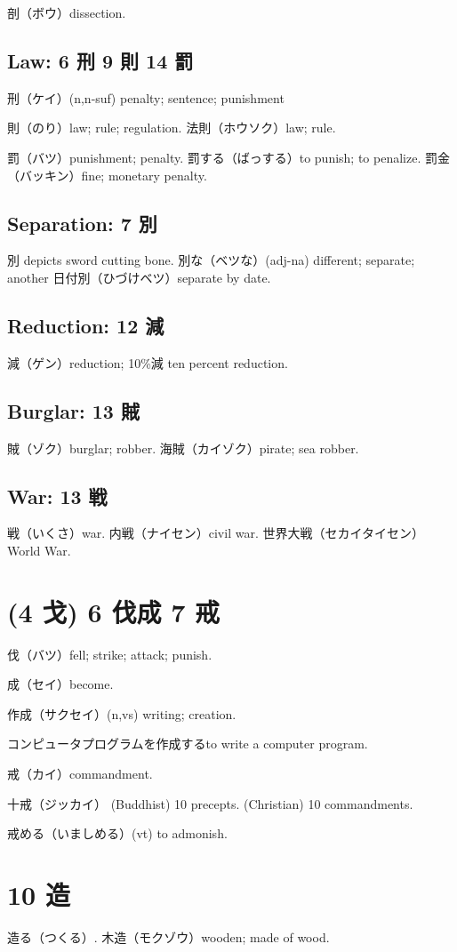 剖（ボウ）dissection.

\subsection{Law: 6 刑 9 則 14 罰}

刑（ケイ）(n,n-suf) penalty; sentence; punishment

則（のり）law; rule; regulation.
法則（ホウソク）law; rule.

罰（バツ）punishment; penalty.
罰する（ばっする）to punish; to penalize.
罰金（バッキン）fine; monetary penalty.

\subsection{Separation: 7 別}

別 depicts sword cutting bone.
別な（ベツな）(adj-na) different; separate; another
日付別（ひづけベツ）separate by date.

\subsection{Reduction: 12 減}

減（ゲン）reduction; 10\%減 ten percent reduction.

\subsection{Burglar: 13 賊}

賊（ゾク）burglar; robber.
海賊（カイゾク）pirate; sea robber.

\subsection{War: 13 戦}

戦（いくさ）war.
内戦（ナイセン）civil war.
世界大戦（セカイタイセン）World War.

\section{(4 戈) 6 伐成 7 戒}

伐（バツ）fell; strike; attack; punish.

成（セイ）become.

作成（サクセイ）(n,vs) writing; creation.

コンピュータプログラムを作成するto write a computer program.

戒（カイ）commandment.

十戒（ジッカイ）
(Buddhist) 10 precepts.
(Christian) 10 commandments.

戒める（いましめる）(vt) to admonish.

\section{10 造}

造る（つくる）.
木造（モクゾウ）wooden; made of wood.
